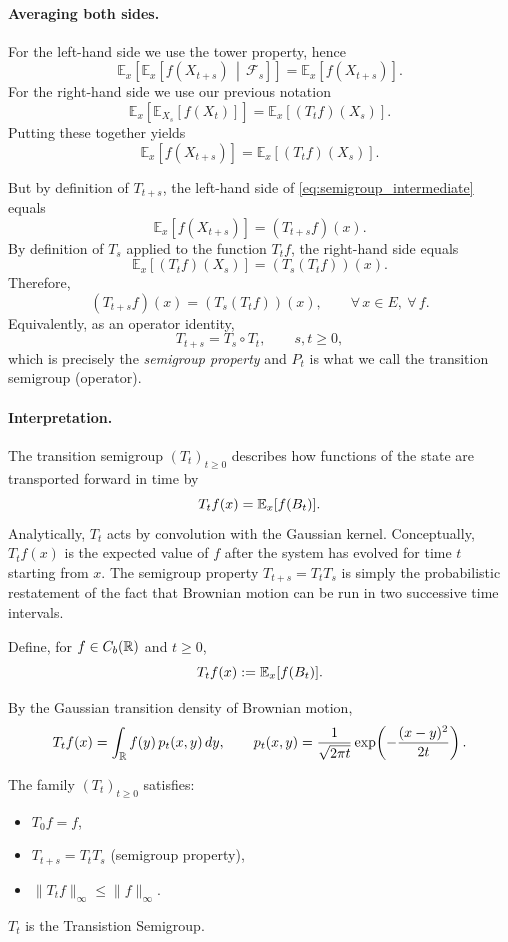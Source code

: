 \paragraph{Averaging both sides.}For the left-hand side we use
the tower property, hence
\[
\mathbb{E}_x\!\left[\mathbb{E}_x\!\left[f(X_{t+s}) \,\middle|\, \mathcal{F}_s\right]\right]
=
\mathbb{E}_x\!\left[f(X_{t+s})\right].
\]
For the right-hand side we use our previous notation
\[
\mathbb{E}_x\!\left[\mathbb{E}_{X_s}\!\left[f(X_t)\right]\right]
=
\mathbb{E}_x\!\left[(T_t f)(X_s)\right].
\]
Putting these together yields
\begin{equation}\label{eq:semigroup_intermediate}
\mathbb{E}_x\!\left[f(X_{t+s})\right]
=
\mathbb{E}_x\!\left[(T_t f)(X_s)\right].
\end{equation}

But by definition of $T_{t+s}$, the left-hand side of \eqref{eq:semigroup_intermediate} equals
\[
\mathbb{E}_x[f(X_{t+s})] = (T_{t+s} f)(x).
\]
By definition of $T_s$ applied to the function $T_t f$, the right-hand side equals
\[
\mathbb{E}_x[(T_t f)(X_s)] = (T_s(T_t f))(x).
\]
Therefore,
\[
(T_{t+s} f)(x) = (T_s(T_t f))(x), \qquad \forall\,x\in E,\ \forall\,f.
\]
Equivalently, as an operator identity,
\[
T_{t+s} = T_s \circ T_t, \qquad s,t\ge 0,
\]
which is precisely the \emph{semigroup property} and $P_t$ is what we call the transition semigroup (operator).

\paragraph{Interpretation.}
The transition semigroup $(T_t)_{t\ge0}$ describes how functions of the state are transported forward in time by
\[
T_t f(x)=\mathbb{E}_x[f(B_t)].
\]
Analytically, $T_t$ acts by convolution with the Gaussian kernel.
Conceptually, $T_t f(x)$ is the expected value of $f$ after the system has evolved for time $t$
starting from $x$.
The semigroup property $T_{t+s}=T_tT_s$ is simply the probabilistic restatement of the fact that Brownian motion
can be run in two successive time intervals.

\medskip

\begin{definition}
Define, for $f\in C_b(\mathbb{R})$ and $t\ge0$,
\[
T_t f(x) := \mathbb{E}_x[f(B_t)].
\]

By the Gaussian transition density of Brownian motion,
\[
T_t f(x)
=
\int_{\mathbb{R}} f(y)\,p_t(x,y)\,dy,
\qquad
p_t(x,y)
=
\frac{1}{\sqrt{2\pi t}}
\exp\!\left(-\frac{(x-y)^2}{2t}\right).
\]

The family $(T_t)_{t\ge0}$ satisfies:
\begin{itemize}
\item $T_0 f = f$,
\item $T_{t+s} = T_t T_s$ (semigroup property),
\item $\|T_t f\|_\infty \le \|f\|_\infty$.
\end{itemize}

$T_t$ is the Transistion Semigroup.
    
\end{definition}


